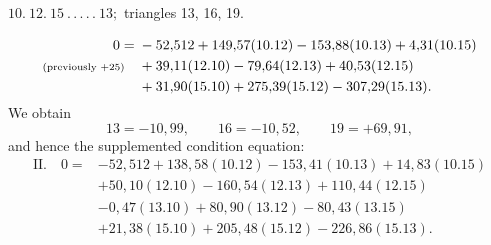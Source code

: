 \par\bigskip
\begin{center}
$10.\ 12.\ 15\ .\,.\,.\,.\,.\ 13;$ triangles 13, 16, 19.
\end{center}
\[
\begin{aligned}
0={}&-52{,}512+149{,}57(10.12)-153{,}88(10.13)+4{,}31(10.15)\\
\text{\scriptsize(previously $+25$)}\quad&+39{,}11(12.10)-79{,}64(12.13)+40{,}53(12.15)\\
&+31{,}90(15.10)+275{,}39(15.12)-307{,}29(15.13).
\end{aligned}
\]
We obtain
\[
13=-10{,}99,\qquad16=-10{,}52,\qquad19=+69{,}91,
\]
and hence the supplemented condition equation:
\[
\begin{aligned}
\mathrm{II.}\quad 0={}&-52{,}512+138{,}58(10.12)-153{,}41(10.13)+14{,}83(10.15)\\
&+50{,}10(12.10)-160{,}54(12.13)+110{,}44(12.15)\\
&-0{,}47(13.10)+80{,}90(13.12)-80{,}43(13.15)\\
&+21{,}38(15.10)+205{,}48(15.12)-226{,}86(15.13).
\end{aligned}
\]
